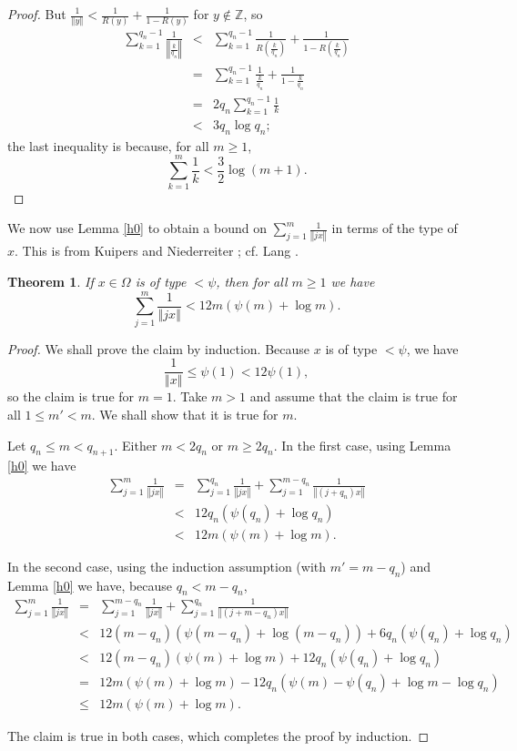 \documentclass{article}
\newcommand{\norm}[1]{\left\Vert #1 \right\Vert}
\newtheorem{theorem}{Theorem}
\begin{document}
\begin{proof}
But $\frac{1}{\norm{y}}<\frac{1}{R(y)}+\frac{1}{1-R(y)}$ for $y \not \in \mathbb{Z}$, so
\begin{eqnarray*}
\sum_{k=1}^{q_n-1} \frac{1}{\norm{\frac{k}{q_n}}}&<&\sum_{k=1}^{q_n-1} \frac{1}{R\left( \frac{k}{q_n} \right)}
+\frac{1}{1-R\left( \frac{k}{q_n} \right)}\\
&=&\sum_{k=1}^{q_n-1} \frac{1}{\frac{k}{q_n}}+\frac{1}{1-\frac{k}{q_n}}\\
&=&2q_n \sum_{k=1}^{q_n-1} \frac{1}{k}\\
&<&3 q_n \log q_n;
\end{eqnarray*}
the last inequality is because, for all $m \geq 1$,
\[
\sum_{k=1}^m \frac{1}{k} < \frac{3}{2}\log(m+1).
\]
\end{proof}







We now use Lemma \ref{h0} to obtain a bound on $\sum_{j=1}^m \frac{1}{\norm{jx}}$  in terms of the type of $x$. This is from Kuipers and Niederreiter \cite[p.~131, Exercise 3.11]{kuipers};
cf. Lang \cite[p.~39, Theorem 2]{MR0209227}.

\begin{theorem}
If $x \in \Omega$ is of type $<\psi$, then for all $m \geq 1$ we have
\[
\sum_{j=1}^m \frac{1}{\norm{jx}}<12m(\psi(m)+\log m).
\]
\label{jalpha}
\end{theorem}
\begin{proof}
We shall prove the claim by induction. Because $x$ is of type $<\psi$, we have
\[
\frac{1}{\norm{x}} \leq \psi(1)<12\psi(1),
\]
so the claim is true for $m=1$. Take $m>1$ and assume that the claim is true for all $1 \leq m'<m$. We shall show that it is true for $m$.

Let $q_n \leq m < q_{n+1}$. Either $m < 2q_n$ or $m \geq 2q_n$.
In the first case, using Lemma \ref{h0}  we have
\begin{eqnarray*}
\sum_{j=1}^m \frac{1}{\norm{jx}}&=&\sum_{j=1}^{q_n} \frac{1}{\norm{jx}}+\sum_{j=1}^{m-q_n} \frac{1}{\norm{(j+q_n)x}}\\
&<&12 q_n(\psi(q_n)+\log q_n)\\
&<&12m(\psi(m)+\log m).
\end{eqnarray*}

In the second case, using the induction assumption (with $m'=m-q_n$) and Lemma \ref{h0} we have, because $q_n<m-q_n$,
\begin{eqnarray*}
\sum_{j=1}^m \frac{1}{\norm{jx}}&=&\sum_{j=1}^{m-q_n} \frac{1}{\norm{jx}}+\sum_{j=1}^{q_n} \frac{1}{\norm{(j +m-q_n)x}}\\
&<&12(m-q_n)\left(\psi(m-q_n)+\log(m-q_n)\right)+6q_n(\psi(q_n)+\log q_n)\\
&<&12(m-q_n)\left(\psi(m)+\log m \right)+12q_n(\psi(q_n)+\log q_n)\\
&=&12m(\psi(m)+\log m)-12q_n\left(\psi(m)-\psi(q_n)+\log m - \log q_n\right)\\
&\leq&12m(\psi(m)+\log m).
\end{eqnarray*}

The claim is true in both cases, which completes the proof by induction.
\end{proof}
\end{document}
